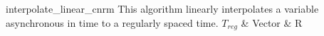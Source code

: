
{ %
interpolate_linear_cnrm
}
{ %
This algorithm linearly interpolates a variable asynchronous in time to a regularly spaced time.  
}
{ %
$T_{reg}$ & Vector & R
}
{ %

}
{ %

}
{ %

}
{ %

}


